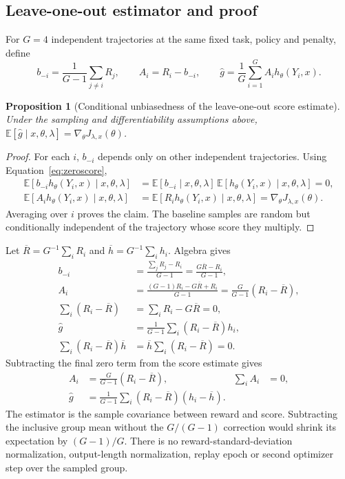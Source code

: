 \documentclass[11pt]{article}
\newtheorem{proposition}{Proposition}[section]
\newcommand{\E}{\mathbb{E}}
\begin{document}
\subsection{Leave-one-out estimator and proof}

For $G=4$ independent trajectories at the same fixed task, policy and penalty, define
\begin{equation}
 b_{-i}=\frac1{G-1}\sum_{j\ne i}R_j,\qquad A_i=R_i-b_{-i},
 \qquad\widehat g=\frac1G\sum_{i=1}^G A_i h_\theta(Y_i,x).
 \label{eq:loo}
\end{equation}
\begin{proposition}[Conditional unbiasedness of the leave-one-out score estimate]
Under the sampling and differentiability assumptions above,
$\E[\widehat g\mid x,\theta,\lambda]=\nabla_\theta J_{\lambda,x}(\theta)$.
\end{proposition}
\begin{proof}
For each $i$, $b_{-i}$ depends only on other independent trajectories. Using Equation~\eqref{eq:zeroscore},
\begin{align}
 \E[b_{-i}h_\theta(Y_i,x)\mid x,\theta,\lambda]
 &=\E[b_{-i}\mid x,\theta,\lambda]\,
                 \E[h_\theta(Y_i,x)\mid x,\theta,\lambda]=0,\\
 \E[A_i h_\theta(Y_i,x)\mid x,\theta,\lambda]
 &=\E[R_i h_\theta(Y_i,x)\mid x,\theta,\lambda]
 =\nabla_\theta J_{\lambda,x}(\theta).
\end{align}
Averaging over $i$ proves the claim. The baseline samples are random but conditionally independent of the trajectory whose score they multiply.
\end{proof}

Let $\overline R=G^{-1}\sum_iR_i$ and $\overline h=G^{-1}\sum_i h_i$. Algebra gives
\begin{align}
 b_{-i}&=\frac{\sum_jR_j-R_i}{G-1}
         =\frac{G\overline R-R_i}{G-1},\\
 A_i&=\frac{(G-1)R_i-G\overline R+R_i}{G-1}
      =\frac{G}{G-1}(R_i-\overline R),\\
 \sum_i(R_i-\overline R)&=\sum_iR_i-G\overline R=0,\\
 \widehat g&=\frac1{G-1}\sum_i(R_i-\overline R)h_i,\\
 \sum_i(R_i-\overline R)\overline h&=\overline h\sum_i(R_i-\overline R)=0.
\end{align}
Subtracting the final zero term from the score estimate gives
\begin{align}
 A_i&=\frac{G}{G-1}(R_i-\overline R),&\sum_i A_i&=0,\\
 \widehat g&=\frac1{G-1}\sum_i(R_i-\overline R)(h_i-\overline h).
 \label{eq:samplecov}
\end{align}
The estimator is the sample covariance between reward and score. Subtracting the inclusive group mean without the $G/(G-1)$ correction would shrink its expectation by $(G-1)/G$. There is no reward-standard-deviation normalization, output-length normalization, replay epoch or second optimizer step over the sampled group.
\end{document}
